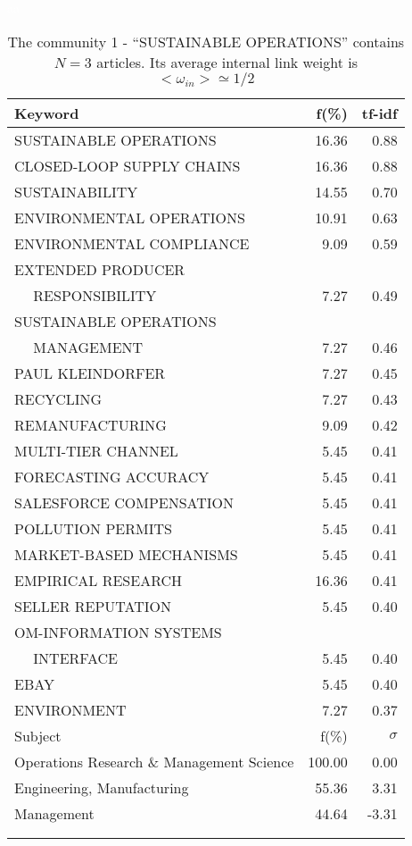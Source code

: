 \documentclass[a4paper,11pt]{report}
\begin{document}
\begin{landscape}
\clearpage

\begin{table}[!ht]
\caption{The community 1 - ``SUSTAINABLE OPERATIONS'' contains $N = 3$ articles. Its average internal link weight is $<\omega_{in}> \simeq 1/2$ }
\textcolor{white}{aa}\\
{\scriptsize\begin{tabular}{|l r  r|}
\hline
Keyword & f(\%) & tf-idf \\
\hline
SUSTAINABLE OPERATIONS & 16.36 & 0.88\\
CLOSED-LOOP SUPPLY CHAINS & 16.36 & 0.88\\
SUSTAINABILITY & 14.55 & 0.70\\
ENVIRONMENTAL OPERATIONS & 10.91 & 0.63\\
ENVIRONMENTAL COMPLIANCE & 9.09 & 0.59\\
EXTENDED PRODUCER &  &\\
$\quad$ RESPONSIBILITY & 7.27 & 0.49\\
SUSTAINABLE OPERATIONS &  &\\
$\quad$ MANAGEMENT & 7.27 & 0.46\\
PAUL KLEINDORFER & 7.27 & 0.45\\
RECYCLING & 7.27 & 0.43\\
REMANUFACTURING & 9.09 & 0.42\\
MULTI-TIER CHANNEL & 5.45 & 0.41\\
FORECASTING ACCURACY & 5.45 & 0.41\\
SALESFORCE COMPENSATION & 5.45 & 0.41\\
POLLUTION PERMITS & 5.45 & 0.41\\
MARKET-BASED MECHANISMS & 5.45 & 0.41\\
EMPIRICAL RESEARCH & 16.36 & 0.41\\
SELLER REPUTATION & 5.45 & 0.40\\
OM-INFORMATION SYSTEMS &  &\\
$\quad$ INTERFACE & 5.45 & 0.40\\
EBAY & 5.45 & 0.40\\
ENVIRONMENT & 7.27 & 0.37\\
\hline
\hline
Subject & f(\%) & $\sigma$\\
\hline
Operations Research \& Management Science & 100.00 & 0.00\\
Engineering, Manufacturing & 55.36 & 3.31\\
Management & 44.64 & -3.31\\
 &  & \\
 &  & \\

\end{tabular}}
\end{table}
\end{landscape}
\end{document}

